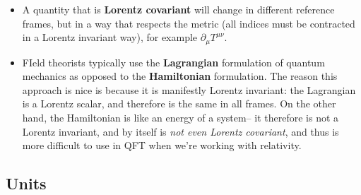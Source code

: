 \documentclass[12pt]{article}
\theoremstyle{mytheorem}
\begin{document}
\begin{itemize}
	\item A quantity that is \textbf{Lorentz covariant} will change in different reference frames, but in a way that 
	respects the metric (all indices must be contracted in a Lorentz invariant way), for example $\partial_\mu T^{\mu\nu}$. 
	
	\item FIeld theorists typically use the \textbf{Lagrangian} formulation of quantum mechanics as opposed to the \textbf{Hamiltonian} 
	formulation. The reason this approach is nice is because it is manifestly Lorentz invariant: the Lagrangian is a Lorentz scalar, 
	and therefore is the same in all frames. On the other hand, the Hamiltonian is like an energy of a system-- it therefore is not 
	a Lorentz invariant, and by itself is \textit{not even Lorentz covariant}, and thus is more difficult to use in QFT when we're 
	working with relativity. 
	
\end{itemize}

\subsection*{Units}
\end{document}
